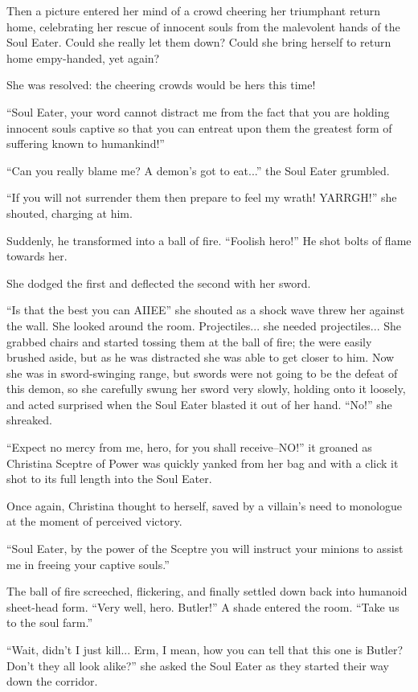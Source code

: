 \documentclass[showtrims,b6paper,draft,10pt]{memoir}
\begin{document}
Then a picture entered her mind of a crowd cheering her triumphant return home, celebrating her rescue of innocent souls from the malevolent hands of the Soul Eater.  Could she really let them down?  Could she bring herself to return home empy-handed, yet again?

She was resolved:  the cheering crowds would be hers this time!

``Soul Eater, your word cannot distract me from the fact that you are holding innocent souls captive so that you can entreat upon them the greatest form of suffering known to humankind!''

``Can you really blame me?  A demon's got to eat...'' the Soul Eater grumbled.

``If you will not surrender them then prepare to feel my wrath!  YARRGH!'' she shouted, charging at him.

Suddenly, he transformed into a ball of fire.  ``Foolish hero!''  He shot bolts of flame towards her.

She dodged the first and deflected the second with her sword.

``Is that the best you can AIIEE'' she shouted as a shock wave threw her against the wall.  She looked around the room.  Projectiles... she needed projectiles...  She grabbed chairs and started tossing them at the ball of fire;  the were easily brushed aside, but as he was distracted she was able to get closer to him.  Now she was in sword-swinging range, but swords were not going to be the defeat of this demon, so she carefully swung her sword very slowly, holding onto it loosely, and acted surprised when the  Soul Eater blasted it out of her hand.  ``No!'' she shreaked.

``Expect no mercy from me, hero, for you shall receive--NO!'' it groaned as Christina Sceptre of Power was quickly yanked from her bag and with a click it shot to its full length into the Soul Eater.

Once again, Christina thought to herself, saved by a villain's need to monologue at the moment of perceived victory.

``Soul Eater, by the power of the Sceptre you will instruct your minions to assist me in freeing your captive souls.''

The ball of fire screeched, flickering, and finally settled down back into humanoid sheet-head form.  ``Very well, hero.  Butler!''  A shade entered the room.  ``Take us to the soul farm.''

``Wait, didn't I just kill...  Erm, I mean, how you can tell that this one is Butler?  Don't they all look alike?'' she asked the Soul Eater as they started their way down the corridor.
\end{document}
